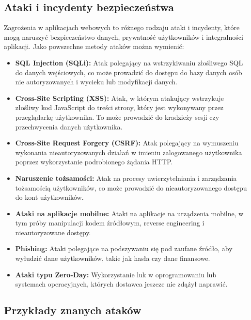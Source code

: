 \documentclass[12pt,twoside]{article}
\begin{document}
\subsection{Ataki i incydenty bezpieczeństwa}

Zagrożenia w aplikacjach webowych to różnego rodzaju ataki i incydenty, które mogą naruszyć bezpieczeństwo danych, prywatność użytkowników i integralności aplikacji. Jako powszechne metody ataków można wymienić:
\begin{itemize}

    \item \textbf{SQL Injection (SQLi):} Atak polegający na wstrzykiwaniu złośliwego SQL do danych wejściowych, co może prowadzić do dostępu do bazy danych osób nie autoryzowanych i wycieku lub modyfikacji danych.

    \item \textbf{Cross-Site Scripting (XSS):} Atak, w którym atakujący wstrzykuje złośliwy kod JavaScript do treści strony, który jest wykonywany przez przeglądarkę użytkownika. To może prowadzić do kradzieży sesji czy przechwycenia danych użytkownika.

    \item \textbf{Cross-Site Request Forgery (CSRF):} Atak polegający na wymuszeniu wykonania nieautoryzowanych działań w imieniu zalogowanego użytkownika poprzez wykorzystanie podrobionego żądania HTTP.

    \item \textbf{Naruszenie tożsamości:} Atak na procesy uwierzytelniania i zarządzania tożsamością użytkowników, co może prowadzić do nieautoryzowanego dostępu do kont użytkowników.

    \item \textbf{Ataki na aplikacje mobilne:} Ataki na aplikacje na urządzenia mobilne, w tym próby manipulacji kodem źródłowym, reverse engineering i nieautoryzowane dostępy.

    \item \textbf{Phishing:} Ataki polegające na podszywaniu się pod zaufane źródło, aby wyłudzić dane użytkowników, takie jak hasła czy dane finansowe.

    \item \textbf{Ataki typu Zero-Day:} Wykorzystanie luk w oprogramowaniu lub systemach operacyjnych, których dostawca jeszcze nie zdążył naprawić.
\end{itemize}
\subsection{Przykłady znanych ataków}
\end{document}

